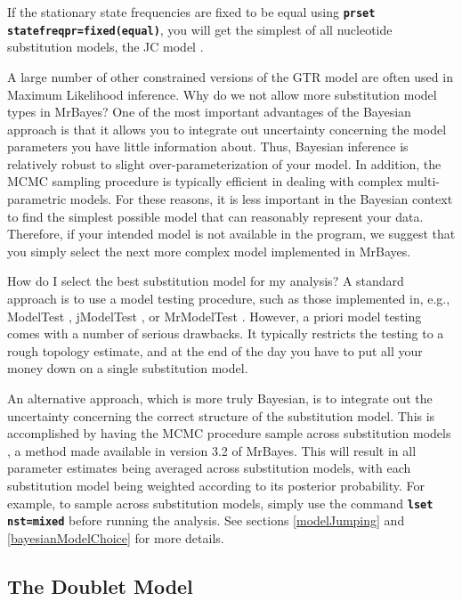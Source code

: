 \documentclass[12pt]{book}
\newcommand{\ttt}[1]{\texttt{#1}}
\newcommand{\tb}[1]{\ttt{\textbf{#1}}}
\begin{document}
If the stationary state frequencies are fixed to be equal using \tb{prset
statefreqpr=fixed(equal)}, you will get the simplest of all nucleotide substitution models, the JC
model \citep{jukes69}.

A large number of other constrained versions of the GTR model are often used in Maximum Likelihood
inference. Why do we not allow more substitution model types in MrBayes? One of the most important
advantages of the Bayesian approach is that it allows you to integrate out uncertainty concerning
the model parameters you have little information about. Thus, Bayesian inference is relatively
robust to slight over-parameterization of your model. In addition, the MCMC sampling procedure is
typically efficient in dealing with complex multi-parametric models. For these reasons, it is less
important in the Bayesian context to find the simplest possible model that can reasonably represent
your data. Therefore, if your intended model is not available in the program, we suggest that you
simply select the next more complex model implemented in MrBayes.

How do I select the best substitution model for my analysis? A standard approach is to use a model
testing procedure, such as those implemented in, e.g., ModelTest \citep{posada98}, jModelTest
\citep{posada08}, or MrModelTest \citep{nylander04b}. However, a priori model testing comes with a
number of serious drawbacks. It typically restricts the testing to a rough topology estimate, and
at the end of the day you have to put all your money down on a single substitution model.

An alternative approach, which is more truly Bayesian, is to integrate out the uncertainty
concerning the correct structure of the substitution model. This is accomplished by having the MCMC
procedure sample across substitution models \citep{huelsenbeck04d}, a method made available in
version 3.2 of MrBayes. This will result in all parameter estimates being averaged across
substitution models, with each substitution model being weighted according to its posterior
probability. For example, to sample across substitution models, simply use the command \tb{lset
nst=mixed} before running the analysis. See sections \ref{modelJumping} and
\ref{bayesianModelChoice} for more details.

\subsection{The Doublet Model}
\end{document}
